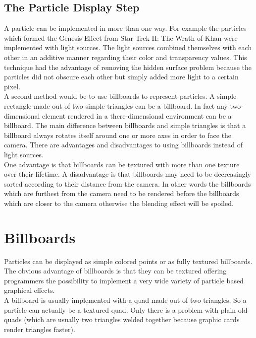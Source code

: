 \newpage
\subsection{The Particle Display Step}
A particle can be implemented in more than one way. For example the particles which formed the Genesis Effect from Star Trek II: The Wrath of Khan were implemented with light sources. The light sources combined themselves with each other in an additive manner regarding their color and transparency values. This technique had the advantage of removing the hidden surface problem because the particles did not obscure each other but simply added more light to a certain pixel.\\

A second method would be to use billboards to represent particles. A simple rectangle made out of two simple triangles can be a billboard. In fact any two-dimensional element rendered in a there-dimensional environment can be a billboard. The main difference between billboards and simple triangles is that a billboard always rotates itself around one or more axes in order to face the camera. There are advantages and disadvantages to using billboards instead of light sources.\\

One advantage is that billboards can be textured with more than one texture over their lifetime. A disadvantage is that billboards may need to be decreasingly sorted according to their distance from the camera. In other words the billboards which are furthest from the camera need to be rendered before the billboards which are closer to the camera otherwise the blending effect will be spoiled.\\

\newpage
\section{Billboards}
Particles can be displayed as simple colored points or as fully textured billboards. The obvious advantage of billboards is that they can be textured offering programmers the possibility to implement a very wide variety of particle based graphical effects.\\

A billboard is usually implemented with a quad made out of two triangles. So a particle can actually be a textured quad. Only there is a problem with plain old quads (which are usually two triangles welded together because graphic cards render triangles faster).\\

